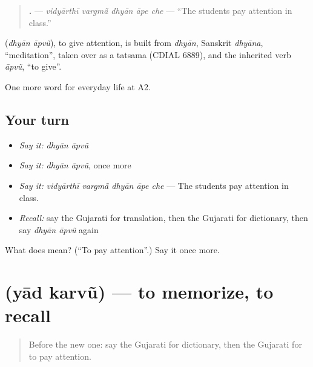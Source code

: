 \begin{quote}
\textbf{    .} — \emph{vidyārthī vargmā̃ dhyān āpe che} — \textquotedblleft{}The students pay attention in class.\textquotedblright{}
\end{quote}

\begin{cousinweb}
\textbf{ } (\emph{dhyān āpvũ}), to give attention, is built from \emph{dhyān}, Sanskrit \emph{dhyāna}, \textquotedblleft{}meditation\textquotedblright{}, taken over as a tatsama (CDIAL 6889), and the inherited verb \emph{āpvũ}, \textquotedblleft{}to give\textquotedblright{}.
\end{cousinweb}

\begin{grammarlens}[title={What you've built}]
One more word for everyday life at A2.
\end{grammarlens}

\subsection*{Your turn}
\begin{itemize}
\raggedright
  \item \emph{Say it:} \emph{dhyān āpvũ}
  \item \emph{Say it:} \emph{dhyān āpvũ}, once more
  \item \emph{Say it:} \emph{vidyārthī vargmā̃ dhyān āpe che} — The students pay attention in class.
  \item \emph{Recall:} say the Gujarati for translation, then the Gujarati for dictionary, then say \emph{dhyān āpvũ} again
\end{itemize}

\begin{tcolorbox}[breakable,colback=teal!4,colframe=teal!35!black,title={Before you move on}]
What does   mean? (\textquotedblleft{}To pay attention\textquotedblright{}.) Say it once more.
\end{tcolorbox}
\section[\texorpdfstring{\gu{યાદ} \gu{કરવું} (yād karvũ)}{યાદ કરવું (yād karvũ)}]{  (yād karvũ) — to memorize, to recall}

\label{lesson:GU-C251-yad-karvu}



\begin{quote}
Before the new one: say the Gujarati for dictionary, then the Gujarati for to pay attention.
\end{quote}

